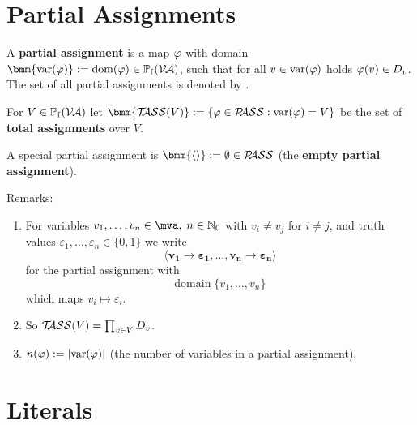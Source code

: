 \documentclass[12pt]{book}
\begin{document}
\section{Partial Assignments}
\label{sec:Partialassignments}

\begin{defi}\label{def:Pass}
      A \textbf{partial assignment} is a map $\varphi$ with domain $\bmm{\var(\vp)} := \dom(\vp) \in \pote(\Va)$, such that for all $v \in \operatorname{var}(\varphi)$ holds $\varphi(v) \in D_v$. 
	  The set of all partial assignments is denoted by \bmm{\Pass}.

      For $V \in \operatorname{\mathbb{P}_f}(\mathcal{V\hspace{-0.1em}A})$ let $\bmm{\Tass(V)} := \set{\vp \in \Pass : \var(\vp) = V}$ be the set of \textbf{total assignments} over $V$.

      A special partial assignment is $\bmm{\epa} := \es \in \Pass$ (the \textbf{empty partial assignment}).
\end{defi}
Remarks:
\begin{enumerate}
      \item For variables $v_1, \ldots, v_n \in \mva, \; n\in \mathbb{N}_0$ with $v_i \neq v_j$ for $i\neq j$, and truth values $\varepsilon_1, \ldots, \varepsilon_n \in \{0,1\}$ we write
      \begin{displaymath}
            \pmb{\langle v_1 \to \varepsilon_1, \ldots, v_n \to \varepsilon_n\rangle}
      \end{displaymath}
      for the partial assignment with
      \begin{displaymath}
            \mbox{domain} \; \{v_1, \ldots, v_n\}
      \end{displaymath}
      which maps $v_i \mapsto \varepsilon_i$.
      \item So $\mathcal{T\hspace{-0.35em}ASS}(V) = \prod_{v \in V} D_v$.
      \item $n(\varphi) := \lvert \operatorname{var}(\varphi)  \rvert$ (the number of variables in a partial assignment).
\end{enumerate}

\section{Literals}
\label{sec:Litsvar}
\end{document}

